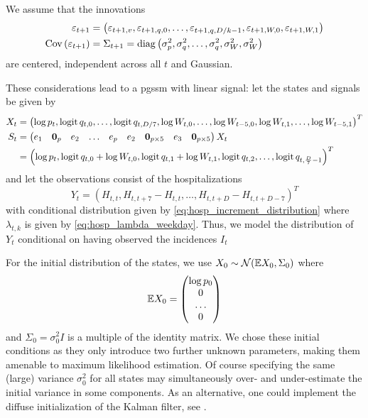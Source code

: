 We assume that the innovations 
\begin{align*}
    \varepsilon_{t + 1} &= \left( \varepsilon_{t + 1, v}, \varepsilon_{t + 1, q,0}, \dots, \varepsilon_{t + 1, q, D / k - 1}, \varepsilon_{t + 1, W, 0}, \varepsilon_{t + 1, W, 1}  \right) \\
    \operatorname{Cov} \left( \varepsilon_{t + 1 } \right) &= \Sigma_{t + 1} = \operatorname{diag} \left( \sigma^{2}_p, \sigma^2_{q}, \dots, \sigma^{2}_q, \sigma^{2}_W , \sigma^{2}_{W}\right)
\end{align*} are centered, independent across all $t$ and Gaussian.

These considerations lead to a \gls{pgssm} with linear signal: let the states and signals be given by 
\begin{align*}
   X_{t} &= \left( \log p_{t}, \operatorname{logit} q_{t,0}, \dots, \operatorname{logit} q_{t, D / 7}, \log W_{t, 0}, \dots, \log W_{t - 5, 0}, \log W_{t, 1}, \dots, \log W_{t - 5, 1} \right) ^{T} \\
   S_{t} &= \begin{pmatrix}
       e_{1} & \mathbf 0_{p} & e_{2} & \dots & e_{p} & e_{2} & \mathbf 0_{p \times 5} & e_{3} & \mathbf 0_{p \times 5}
   \end{pmatrix} X_{t} \\
   & = \left( \log p_{t}, \operatorname{logit} q_{t,0} + \log W_{t, 0}, \operatorname{logit} q_{t, 1} + \log W_{t, 1}, \operatorname{logit} q_{t, 2}, \dots, \operatorname{logit} q_{t, \frac{D}{7} - 1} \right)^{T}
\end{align*}
and let the observations consist of the hospitalizations 
$$
    Y_{t} = \left( H_{t,t},  H_{t, t + 7} - H^{}_{t, t} , \dots, H_{t, t + D} - H^{}_{t, t + D - 7}\right)^{T}
$$
with conditional distribution given by \eqref{eq:hosp_increment_distribution} where $\lambda_{t,k}$ is given by \eqref{eq:hosp_lambda_weekday}. Thus, we model the distribution of $Y_{t}$ conditional on having observed the incidences $I_{t}$

For the initial distribution of the states, we use $X_{0} \sim \mathcal N(\mathbb E X_{0}, \Sigma_0)$ where 
$$
    \mathbb E X_{0} = \begin{pmatrix}
        \log p_{0} \\
        0 \\
        \dots \\
        0
    \end{pmatrix}
$$
and $\Sigma_{0} = \sigma^{2}_0 I$ is a multiple of the identity matrix. We chose these initial conditions as they only introduce two further unknown parameters, making them amenable to maximum likelihood estimation. Of course specifying the same (large) variance $\sigma^{2}_0$ for all states may simultaneously over- and under-estimate the initial variance in some components. As an alternative, one could implement the diffuse initialization of the Kalman filter, see \citep{Ansley1985Estimation,Koopman1997Exact}.


